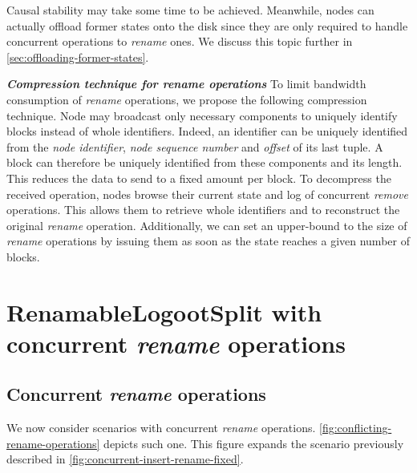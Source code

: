 \documentclass[10pt,journal,compsoc]{IEEEtran}
\newcommand{\headerparagraph}[1]{\textbf{\emph{#1}}\quad}
\begin{document}
Causal stability may take some time to be achieved.
Meanwhile, nodes can actually offload former states onto the disk since they are only required to handle concurrent operations to \emph{rename} ones.
We discuss this topic further in \autoref{sec:offloading-former-states}.

\headerparagraph{Compression technique for \emph{rename} operations}
%
To limit bandwidth consumption of \emph{rename} operations, we propose the following compression technique.
Node may broadcast only necessary components to uniquely identify blocks instead of whole identifiers.
Indeed, an identifier can be uniquely identified from the \emph{node identifier}, \emph{node sequence number} and \emph{offset} of its last tuple.
A block can therefore be uniquely identified from these components and its length.
This reduces the data to send to a fixed amount per block.
To decompress the received operation, nodes browse their current state and log of concurrent \emph{remove} operations.
This allows them to retrieve whole identifiers and to reconstruct the original \emph{rename} operation.
Additionally, we can set an upper-bound to the size of \emph{rename} operations by issuing them as soon as the state reaches a given number of blocks.


\section{RenamableLogootSplit with concurrent \emph{rename} operations}

\label{sec:distributed-rls}

\subsection{Concurrent \emph{rename} operations}

We now consider scenarios with concurrent \emph{rename} operations.
\autoref{fig:conflicting-rename-operations} depicts such one.
This figure expands the scenario previously described in \autoref{fig:concurrent-insert-rename-fixed}.
\end{document}
